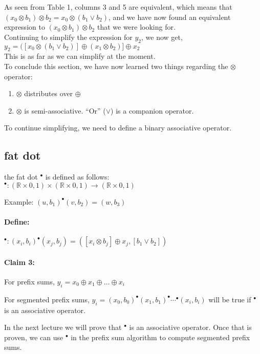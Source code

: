 \documentclass[11pt]{article}
\begin{document}
As seen from Table 1, columns 3 and 5 are equivalent, which means that $(x_0 \otimes b_1) \otimes b_2 = x_0 \otimes (b_1 \vee b_2)$, and we have now found an equivalent expression to $(x_0 \otimes b_1) \otimes b_2$ that we were looking for.\\

Continuing to simplify the expression for $y_2$, we now get,\\
$y_2 = ([x_0 \otimes (b_1 \vee b_2)] \oplus (x_1 \otimes b_2)] \oplus x_2$ \\
This is as far as we can simplify at the moment.\\

To conclude this section, we have now learned two things regarding the $\otimes$ operator:
\begin{enumerate}
\item {\em} $\otimes$ distributes over $\oplus$
\item {\em} $\otimes$ is semi-associative. “Or” ($\vee$) is a companion operator.
\end{enumerate}

To continue simplifying, we need to define a binary associative operator.

\subsection{fat dot}

the fat dot $^{\bullet}$ is defined as follows:\\

$^{\bullet}: (\mathbb{R} \times {0,1}) \times (\mathbb{R} \times {0,1}) \longrightarrow (\mathbb{R} \times {0,1})$

Example: $(u, b_1) ^{\bullet} (v, b_2) = (w, b_3)$\\

\paragraph{Define:} $^{\bullet} : (x_i, b_i) ^{\bullet} (x_j, b_j) = ([x_i \otimes b_j] \oplus x_j , [b_1 \vee b_2])$

\paragraph{Claim 3:} For prefix sums, $y_i = x_0 \oplus x_1 \oplus \dots \oplus x_i$

For segmented prefix sums, $y_i = (x_0 , b_0) ^{\bullet} (x_1 , b_1) ^{\bullet} \cdots ^{\bullet} (x_i , b_i)$ will be true if $^{\bullet}$ is an associative operator.

In the next lecture we will prove that $^{\bullet}$ is an associative operator. Once that is proven, we can use $^{\bullet}$ in the prefix sum algorithm to compute segmented prefix sums.            

%

\end{document}
